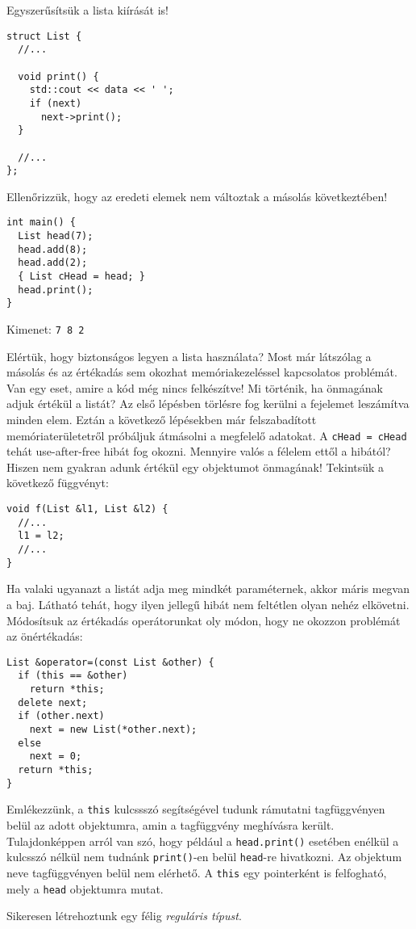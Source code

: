 \documentclass[../cpp_book/cpp_book.tex]{subfiles}
\begin{document}
	Egyszerűsítsük a lista kiírását is!
	\begin{lstlisting}
struct List {
  //...

  void print() {
    std::cout << data << ' ';
    if (next)
      next->print();
  }

  //...
};
	\end{lstlisting}
	Ellenőrizzük, hogy az eredeti elemek nem változtak a másolás következtében!
	\begin{lstlisting}
int main() {
  List head(7);
  head.add(8);
  head.add(2);
  { List cHead = head; }
  head.print();
}
	\end{lstlisting}
	Kimenet: \texttt{7 8 2}
	
	Elértük, hogy biztonságos legyen a lista használata? Most már látszólag a másolás és az értékadás sem okozhat memóriakezeléssel kapcsolatos problémát. Van egy eset, amire a kód még nincs felkészítve! Mi történik, ha önmagának adjuk értékül a listát? Az első lépésben törlésre fog kerülni a fejelemet leszámítva minden elem. Eztán a következő lépésekben már felszabadított memóriaterületetről próbáljuk átmásolni a megfelelő adatokat. A \texttt{cHead = cHead} tehát use-after-free hibát fog okozni. Mennyire valós a félelem ettől a hibától? Hiszen nem gyakran adunk értékül egy objektumot önmagának! Tekintsük a következő függvényt:
	\begin{lstlisting}
void f(List &l1, List &l2) {
  //...
  l1 = l2;
  //...
}
	\end{lstlisting}
	Ha valaki ugyanazt a listát adja meg mindkét paraméternek, akkor máris megvan a baj. Látható tehát, hogy ilyen jellegű hibát nem feltétlen olyan nehéz elkövetni.  Módosítsuk az értékadás operátorunkat oly módon, hogy ne okozzon problémát az önértékadás:
\begin{lstlisting}
List &operator=(const List &other) {
  if (this == &other)
    return *this;
  delete next;
  if (other.next)
    next = new List(*other.next);
  else
    next = 0;
  return *this;
}
\end{lstlisting}
  Emlékezzünk, a \texttt{this} kulcssszó segítségével tudunk rámutatni tagfüggvényen belül az adott objektumra, amin a tagfüggvény meghívásra került. Tulajdonképpen arról van szó, hogy például a \texttt{head.print()} esetében enélkül a kulcsszó nélkül nem tudnánk \texttt{print()}-en belül \texttt{head}-re hivatkozni. Az objektum neve tagfüggvényen belül nem elérhető. A \texttt{this} egy pointerként is felfogható, mely a \texttt{head} objektumra mutat.
	\medskip

	Sikeresen létrehoztunk egy félig \textit{reguláris típust}.
	\medskip
	
\end{document}
